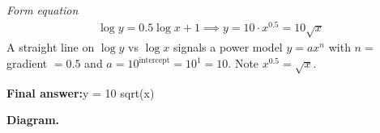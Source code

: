 \documentclass[11pt]{article}
\begin{document}
\textit{Form equation}
\[\begin{gathered}
\log y = 0.5\log x + 1 \implies y = 10 \cdot x^{0.5} = 10\sqrt{x}
\end{gathered}\]
A straight line on \( \log y \) vs \( \log x \) signals a power model \( y = ax^{n} \) with \( n = \) gradient \( = 0.5 \) and \( a = 10^{\text{intercept}} = 10^{1} = 10 \). Note \( x^{0.5} = \sqrt{x} \).

\begin{answerbox}
\textbf{Final answer:}\quad y = 10 sqrt(x)
\end{answerbox}
\textbf{Diagram.}

\begin{center}
\end{center}
\end{document}
